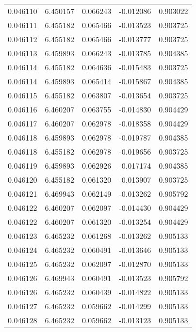 \begin{tabular}{lrrrr}
0.046110    &  6.450157 &  0.066243 & -0.012086 &             0.903022 \\
0.046111    &  6.455182 &  0.065466 & -0.013523 &             0.903725 \\
0.046112    &  6.455182 &  0.065466 & -0.013777 &             0.903725 \\
0.046113    &  6.459893 &  0.066243 & -0.013785 &             0.904385 \\
0.046114    &  6.455182 &  0.064636 & -0.015483 &             0.903725 \\
0.046114    &  6.459893 &  0.065414 & -0.015867 &             0.904385 \\
0.046115    &  6.455182 &  0.063807 & -0.013654 &             0.903725 \\
0.046116    &  6.460207 &  0.063755 & -0.014830 &             0.904429 \\
0.046117    &  6.460207 &  0.062978 & -0.018358 &             0.904429 \\
0.046118    &  6.459893 &  0.062978 & -0.019787 &             0.904385 \\
0.046118    &  6.455182 &  0.062978 & -0.019656 &             0.903725 \\
0.046119    &  6.459893 &  0.062926 & -0.017174 &             0.904385 \\
0.046120    &  6.455182 &  0.061320 & -0.013907 &             0.903725 \\
0.046121    &  6.469943 &  0.062149 & -0.013262 &             0.905792 \\
0.046122    &  6.460207 &  0.062097 & -0.014430 &             0.904429 \\
0.046122    &  6.460207 &  0.061320 & -0.013254 &             0.904429 \\
0.046123    &  6.465232 &  0.061268 & -0.013262 &             0.905133 \\
0.046124    &  6.465232 &  0.060491 & -0.013646 &             0.905133 \\
0.046125    &  6.465232 &  0.062097 & -0.012870 &             0.905133 \\
0.046126    &  6.469943 &  0.060491 & -0.013523 &             0.905792 \\
0.046126    &  6.465232 &  0.060439 & -0.014822 &             0.905133 \\
0.046127    &  6.465232 &  0.059662 & -0.014299 &             0.905133 \\
0.046128    &  6.465232 &  0.059662 & -0.013123 &             0.905133 \\

\end{tabular}
